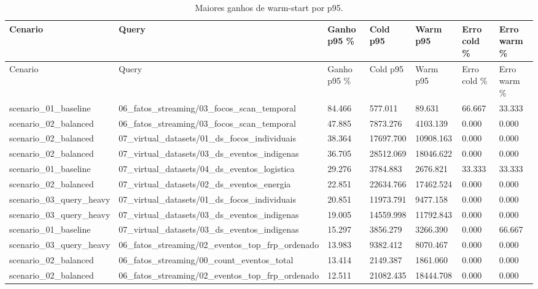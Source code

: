 {
\scriptsize
\setlength{\tabcolsep}{4pt}
\renewcommand{\arraystretch}{1.15}
\begin{longtable}{p{}p{}p{}p{}p{}p{}p{}}
\caption{Maiores ganhos de warm-start por p95.}\\
\toprule
Cenario & Query & Ganho p95 \% & Cold p95 & Warm p95 & Erro cold \% & Erro warm \% \\
\midrule
\endfirsthead
\toprule
Cenario & Query & Ganho p95 \% & Cold p95 & Warm p95 & Erro cold \% & Erro warm \% \\
\midrule
\endhead
scenario\_01\_baseline & 06\_fatos\_streaming/03\_focos\_scan\_temporal & 84.466 & 577.011 & 89.631 & 66.667 & 33.333 \\
scenario\_02\_balanced & 06\_fatos\_streaming/03\_focos\_scan\_temporal & 47.885 & 7873.276 & 4103.139 & 0.000 & 0.000 \\
scenario\_02\_balanced & 07\_virtual\_datasets/01\_ds\_focos\_individuais & 38.364 & 17697.700 & 10908.163 & 0.000 & 0.000 \\
scenario\_02\_balanced & 07\_virtual\_datasets/03\_ds\_eventos\_indigenas & 36.705 & 28512.069 & 18046.622 & 0.000 & 0.000 \\
scenario\_01\_baseline & 07\_virtual\_datasets/04\_ds\_eventos\_logistica & 29.276 & 3784.883 & 2676.821 & 33.333 & 33.333 \\
scenario\_02\_balanced & 07\_virtual\_datasets/02\_ds\_eventos\_energia & 22.851 & 22634.766 & 17462.524 & 0.000 & 0.000 \\
scenario\_03\_query\_heavy & 07\_virtual\_datasets/01\_ds\_focos\_individuais & 20.851 & 11973.791 & 9477.158 & 0.000 & 0.000 \\
scenario\_03\_query\_heavy & 07\_virtual\_datasets/03\_ds\_eventos\_indigenas & 19.005 & 14559.998 & 11792.843 & 0.000 & 0.000 \\
scenario\_01\_baseline & 07\_virtual\_datasets/03\_ds\_eventos\_indigenas & 15.297 & 3856.279 & 3266.390 & 0.000 & 66.667 \\
scenario\_03\_query\_heavy & 06\_fatos\_streaming/02\_eventos\_top\_frp\_ordenado & 13.983 & 9382.412 & 8070.467 & 0.000 & 0.000 \\
scenario\_02\_balanced & 06\_fatos\_streaming/00\_count\_eventos\_total & 13.414 & 2149.387 & 1861.060 & 0.000 & 0.000 \\
scenario\_02\_balanced & 06\_fatos\_streaming/02\_eventos\_top\_frp\_ordenado & 12.511 & 21082.435 & 18444.708 & 0.000 & 0.000 \\

\end{longtable}}
